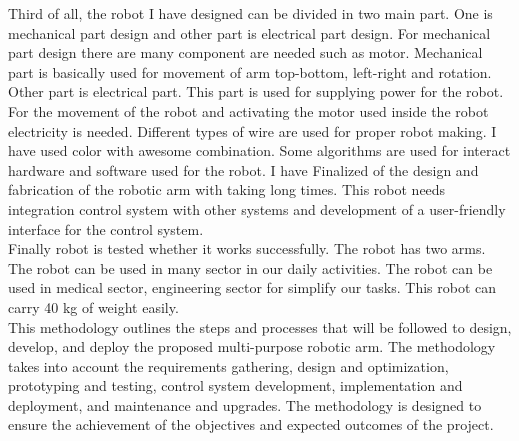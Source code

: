 Third of all, the robot I have designed can be divided in two main part. One is mechanical part design and other part is electrical part design. For mechanical part design there are many component are needed such as motor. Mechanical part is basically used for movement of arm top-bottom, left-right and rotation. Other part is electrical part. This part is used for supplying power for the robot.  For the movement of the robot and activating the motor used inside the robot electricity is needed. Different types of wire are used for proper robot making. I have used color with awesome combination. Some algorithms are used for interact hardware and software used for the robot. I have Finalized of the design and fabrication of the robotic arm with taking long times. This robot needs integration control system with other systems and development of a user-friendly interface for the control system. \\ 
 Finally robot is tested whether it works successfully. The robot has two arms. The robot can be used in many sector in our daily activities. The robot can be used in medical sector, engineering sector for simplify our tasks. This robot can carry 40 kg of weight easily.\\
 This methodology outlines the steps and processes that will be followed to design, develop, and deploy the proposed multi-purpose robotic arm. The methodology takes into account the requirements gathering, design and optimization, prototyping and testing, control system development, implementation and deployment, and maintenance and upgrades. The methodology is designed to ensure the achievement of the objectives and expected outcomes of the project.



